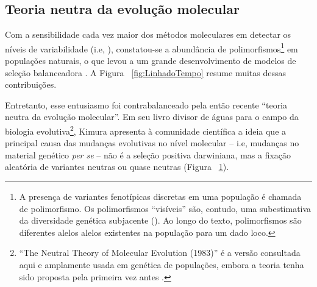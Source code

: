 \begin{refsection}
\begin{figure}[h]
\label{fig:ProportionMutations}
\end{figure}
%

\subsection{Teoria neutra da evolução molecular}%

\label{sec:Kimura}
	Com a sensibilidade cada vez maior dos métodos moleculares em detectar os níveis de variabilidade (i.e, \cite{Lewontin1966}), constatou-se a abundância de polimorfismos\footnote{A presença de variantes fenotípicas discretas em uma população é chamada de polimorfismo. Os polimorfismos \enquote{visíveis} são, contudo, uma subestimativa da diversidade genética subjacente (\cite{Charlesworth2010}). Ao longo do texto, polimorfismos são diferentes alelos alelos existentes na população para um dado loco.} em populações naturais, o que levou a um grande desenvolvimento de modelos de seleção balanceadora \parencite{Gloss2016}. A Figura ~\ref{fig:LinhadoTempo} resume muitas dessas contribuições.
   
   Entretanto, esse entusiasmo foi contrabalanceado pela então recente \enquote{teoria neutra da evolução molecular}. Em seu livro divisor de águas para o campo da biologia evolutiva\footnote{\enquote{The Neutral Theory of Molecular Evolution (1983)} é a versão consultada aqui e amplamente usada em genética de populações, embora a teoria tenha sido proposta pela primeira vez antes \parencite{Kimura1968}.}, Kimura apresenta à comunidade científica a ideia que a principal causa das mudanças evolutivas no nível molecular -- i.e, mudanças no material genético \emph{per se} -- não é a seleção positiva darwiniana, mas a fixação aleatória de variantes neutras ou quase neutras (Figura ~\ref{fig:ProportionMutations}). 
  

\end{refsection}
